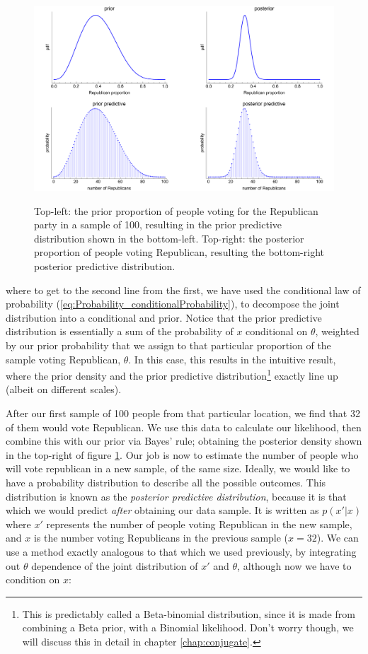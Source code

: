 \documentclass[11pt,fullpage]{book}
\begin{document}
\begin{figure}
\centering
\scalebox{0.4} 
{\includegraphics{Posterior_priorPosteriorPredictiveVoting.pdf}}
\caption{Top-left: the prior proportion of people voting for the Republican party in a sample of 100, resulting in the prior predictive distribution shown in the bottom-left. Top-right: the posterior proportion of people voting Republican, resulting the bottom-right posterior predictive distribution.}\label{fig:Posterior_priorPosteriorPredictiveVoting}
\end{figure}


where to get to the second line from the first, we have used the conditional law of probability (\ref{eq:Probability_conditionalProbability}), to decompose the joint distribution into a conditional and prior. Notice that the prior predictive distribution is essentially a sum of the probability of $x$ conditional on $\theta$, weighted by our prior probability that we assign to that particular proportion of the sample voting Republican, $\theta$. In this case, this results in the intuitive result, where the prior density and the prior predictive distribution\footnote{This is predictably called a Beta-binomial distribution, since it is made from combining a Beta prior, with a Binomial likelihood. Don't worry though, we will discuss this in detail in chapter \ref{chap:conjugate}.} exactly line up (albeit on different scales).

After our first sample of 100 people from that particular location, we find that 32 of them would vote Republican. We use this data to calculate our likelihood, then combine this with our prior via Bayes' rule; obtaining the posterior density shown in the top-right of figure \ref{fig:Posterior_priorPosteriorPredictiveVoting}. Our job is now to estimate the number of people who will vote republican in a new sample, of the same size. Ideally, we would like to have a probability distribution to describe all the possible outcomes. This distribution is known as the \textit{posterior predictive distribution}, because it is that which we would predict \textit{after} obtaining our data sample. It is written as $p(x'|x)$ where $x'$ represents the number of people voting Republican in the new sample, and $x$ is the number voting Republicans in the previous sample ($x=32$). We can use a method exactly analogous to that which we used previously, by integrating out $\theta$ dependence of the joint distribution of $x'$ and $\theta$, although now we have to condition on $x$:
\end{document}

